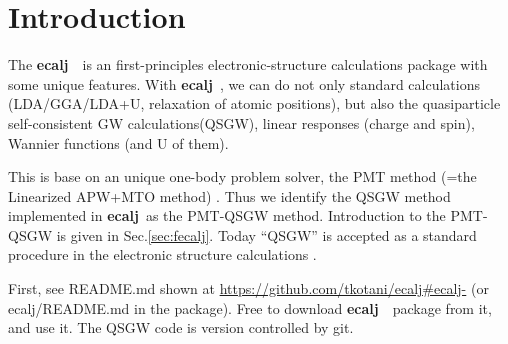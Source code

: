 \documentclass[a4paper,10pt,epsf,fleqn]{article}
\newcommand{\ecalj}{{\bf ecalj}\ }
\begin{document}
%
\newpage
\section{Introduction}
The \ecalj\ is an first-principles electronic-structure 
calculations package with some unique features.
With \ecalj, we can do not only standard calculations
(LDA/GGA/LDA+U, relaxation of atomic positions), but also 
the quasiparticle self-consistent GW calculations(QSGW),
linear responses (charge and spin), Wannier functions (and U of them).

This is base on an unique one-body problem solver, the PMT method 
(=the Linearized APW+MTO method) \cite{kotani2015pmt}.
Thus we identify the QSGW method implemented in \ecalj as the PMT-QSGW method.
Introduction to the PMT-QSGW is given in Sec.\ref{sec:fecalj}. 
Today ``QSGW'' is accepted as a standard procedure in the electronic
structure calculations \cite{di_valentin_quasiparticle_2014}.




First, see README.md shown at 
\url{https://github.com/tkotani/ecalj#ecalj-} 
(or ecalj/README.md in the package).
Free to download \ecalj\ package from it, and use it.
The QSGW code is version controlled by git. 

\end{document}
